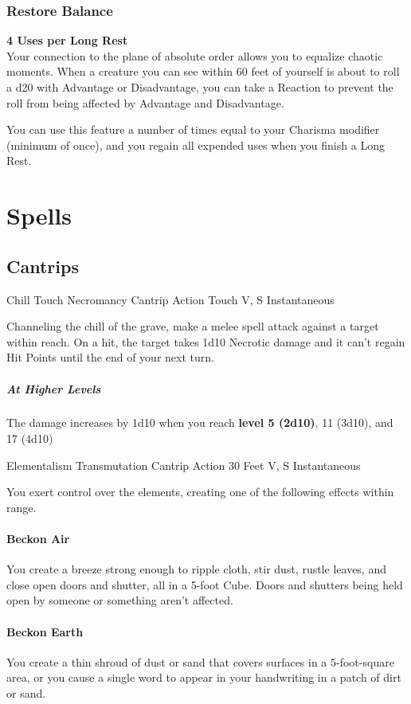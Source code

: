 \documentclass[letterpaper,openany,oneside,twocolumn]{book}
\begin{document}
\subsubsection*{Restore Balance}
\textbf{4 Uses per Long Rest}\\
Your connection to the plane of absolute order allows you to equalize chaotic moments. When a creature you can see within 60 feet of yourself is about to roll a d20 with Advantage or Disadvantage, you can take a Reaction to prevent the roll from being affected by Advantage and Disadvantage.

You can use this feature a number of times equal to your Charisma modifier (minimum of once), and you regain all expended uses when you finish a Long Rest.

\section*{Spells}
\subsection*{Cantrips}

\DndSpellHeader
  {Chill Touch}
  {Necromancy Cantrip}
  {Action}
  {Touch}
  {V, S}
  {Instantaneous}

Channeling the chill of the grave, make a melee spell attack against a target within reach. On a hit, the target takes 1d10 Necrotic damage and it can't regain Hit Points until the end of your next turn.

\subparagraph*{At Higher Levels} The damage increases by 1d10 when you reach \textbf{level 5 (2d10)}, 11 (3d10), and 17 (4d10)

\DndSpellHeader
  {Elementalism}
  {Transmutation Cantrip}
  {Action}
  {30 Feet}
  {V, S}
  {Instantaneous}

You exert control over the elements, creating one of the following effects within range.
\paragraph*{Beckon Air} You create a breeze strong enough to ripple cloth, stir dust, rustle leaves, and close open doors and shutter, all in a 5-foot Cube. Doors and shutters being held open by someone or something aren't affected.
\paragraph*{Beckon Earth} You create a thin shroud of dust or sand that covers surfaces in a 5-foot-square area, or you cause a single word to appear in your handwriting in a patch of dirt or sand.
\end{document}
